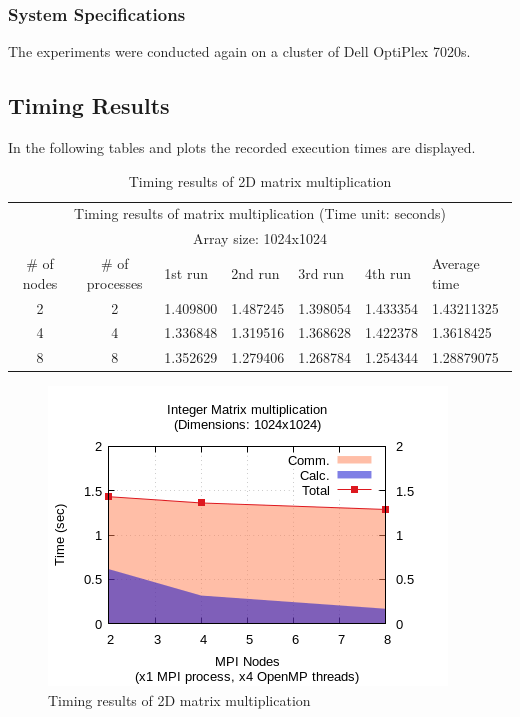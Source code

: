 \documentclass{article}
\begin{document}
\subsubsection{System Specifications}
The experiments were conducted again on a cluster of Dell OptiPlex 7020s.

\subsection{Timing Results}
In the following tables and plots the recorded execution times are displayed.


\begin{table}[htbp]
  \centering
    \begin{tabular}{|c c||l l l l| l|} 
    \hline
    \multicolumn{7}{|c|}{Timing results of matrix multiplication (Time unit: seconds)} \\
    \multicolumn{7}{|c|}{Array size: 1024x1024} \\
    \hline
    \# of nodes & \# of processes & 1st run & 2nd run & 3rd run & 4th run & Average time\\ [0.5ex] 
    \hline\hline
    2 & 2 & 1.409800 & 1.487245 & 1.398054 & 1.433354 & 1.43211325 \\ 
    \hline
    4 & 4 & 1.336848 & 1.319516 & 1.368628 & 1.422378 & 1.3618425 \\
    \hline
    8 & 8 & 1.352629 & 1.279406 & 1.268784 & 1.254344 & 1.28879075 \\ [1ex]
    \hline
    \end{tabular}
  \caption{Timing results of 2D matrix multiplication}
\end{table}


\begin{figure}[htbp]
  \centering
  \includegraphics[width=0.55\columnwidth]{../../hw3/ex2/plots/matmul.png}
  \caption{Timing results of 2D matrix multiplication}
\end{figure}
\end{document}
